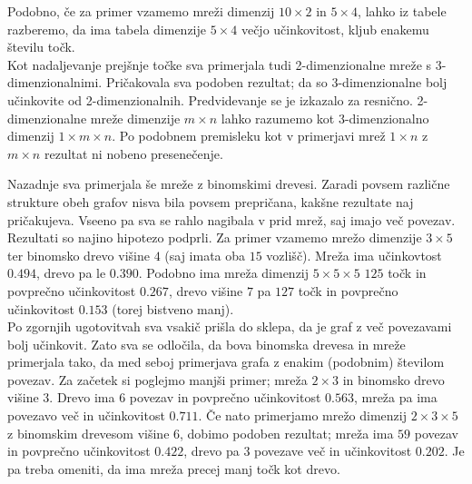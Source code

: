 \documentclass[a4paper, 16pt]{article}
\begin{document}
    Podobno, če za primer vzamemo mreži dimenzij $10 \times 2$ in $5 \times 4$, lahko iz tabele razberemo, da ima tabela dimenzije
    $5 \times 4$ večjo učinkovitost, kljub enakemu številu točk. \\

    Kot nadaljevanje prejšnje točke sva primerjala tudi 2-dimenzionalne mreže s 3-dimenzionalnimi. Pričakovala sva
    podoben rezultat; da so 3-dimenzionalne bolj učinkovite od 2-dimenzionalnih. Predvidevanje se je izkazalo za resnično.
    2-dimenzionalne mreže dimenzije $m \times n$ lahko razumemo kot 3-dimenzionalno dimenzij $1 \times m \times n$. Po podobnem 
    premisleku kot v primerjavi mrež $1 \times n$ z $m \times n$ rezultat ni nobeno presenečenje.

    Nazadnje sva primerjala še mreže z binomskimi drevesi. Zaradi povsem različne strukture obeh grafov nisva bila povsem prepričana,
    kakšne rezultate naj pričakujeva. Vseeno pa sva se rahlo nagibala v prid mrež, saj imajo več povezav. Rezultati so najino hipotezo
    podprli. Za primer vzamemo mrežo dimenzije $3 \times 5$ ter binomsko drevo višine $4$ (saj imata oba $15$ vozlišč). Mreža ima 
    učinkovtost $0.494$, drevo pa le $0.390$. Podobno ima mreža dimenzij $5 \times 5 \times 5$ $125$ točk in povprečno učinkovitost $0.267$,
    drevo višine $7$ pa $127$ točk in povprečno učinkovitost $0.153$ (torej bistveno manj).\\

    Po zgornjih ugotovitvah sva vsakič prišla do sklepa, da je graf z več povezavami bolj učinkovit. Zato sva se odločila, da bova binomska drevesa
    in mreže primerjala tako, da med seboj primerjava grafa z enakim (podobnim) številom povezav. Za začetek si poglejmo manjši primer; mreža 
    $2 \times 3$ in binomsko drevo višine $3$. Drevo ima $6$ povezav in povprečno učinkovitost $0.563$, mreža pa ima povezavo več in učinkovitost $0.711$.
    Če nato primerjamo mrežo dimenzij $2 \times 3 \times 5$ z binomskim drevesom višine $6$, dobimo podoben rezultat; mreža ima $59$ povezav in 
    povprečno učinkovitost $0.422$, drevo pa $3$ povezave več in učinkovitost $0.202$. Je pa treba omeniti, da ima mreža precej manj točk kot drevo.
    
\end{document}
